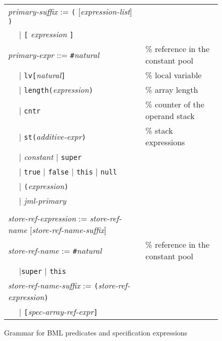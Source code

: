 \documentclass[a4paper]{llncs}
\begin{document}
\begin{figure}[t]

\begin{tabular}{lll}
\multicolumn{2}{l}{\emph{primary-suffix} := \texttt{(} [\emph{expression-list}] \texttt{)}}\\
\hspace*{1cm}& \(\mid\) \texttt{[} \emph{expression} \texttt{]}\\
\multicolumn{2}{l}{\emph{primary-expr} ::= 
\texttt{\#}\emph{natural}} & \% reference in the constant pool \\
&\(\mid\) \texttt{lv[}\emph{natural}\texttt{]} &\% local variable \\
&\(\mid\) \texttt{length(}\emph{expression}\texttt{)} &\% array
length \\
&\(\mid\) \texttt{cntr} &\% counter of the operand stack\\
&\(\mid\) \texttt{st(}\emph{additive-expr}\texttt{)} &\% stack
expressions\\
&\(\mid\) \emph{constant} \(\mid\)
\texttt{super}\\
&\(\mid\) \texttt{true} \(\mid\) \texttt{false} \(\mid\)
\texttt{this} \(\mid\) \texttt{null} \\
&\(\mid\) \texttt{(}\emph{expression}\texttt{)}\\
&\(\mid\) \emph{jml-primary}\\
\\
\multicolumn{2}{l}{\emph{store-ref-expression} := \emph{store-ref-name}
[\emph{store-ref-name-suffix}]}\\
\multicolumn{2}{l}{\emph{store-ref-name} := 
\texttt{\#}\emph{natural}} &\% reference in the constant pool \\
&\(\mid\)\texttt{super} \(\mid\) \texttt{this}\\
\multicolumn{2}{l}{\emph{store-ref-name-suffix} := 
\texttt{(}\emph{store-ref-expression}\texttt{)}}\\
&\(\mid\) \texttt{[}\emph{spec-array-ref-expr}\texttt{]}
\end{tabular}

\caption{Grammar for BML predicates and specification expressions}
\label{FigBMLGrammar}
\end{figure}
\end{document}
